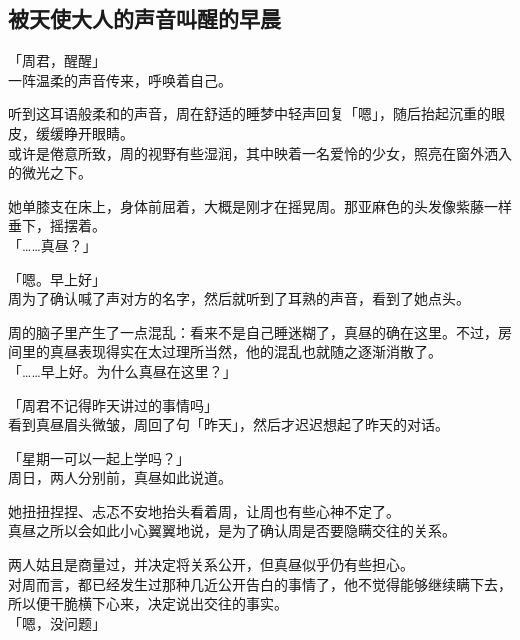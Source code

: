 \subsection{被天使大人的声音叫醒的早晨}

「周君，醒醒」\\

一阵温柔的声音传来，呼唤着自己。

听到这耳语般柔和的声音，周在舒适的睡梦中轻声回复「嗯」，随后抬起沉重的眼皮，缓缓睁开眼睛。\\

或许是倦意所致，周的视野有些湿润，其中映着一名爱怜的少女，照亮在窗外洒入的微光之下。

她单膝支在床上，身体前屈着，大概是刚才在摇晃周。那亚麻色的头发像紫藤一样垂下，摇摆着。\\

「……真昼？」

「嗯。早上好」\\

周为了确认喊了声对方的名字，然后就听到了耳熟的声音，看到了她点头。

周的脑子里产生了一点混乱：看来不是自己睡迷糊了，真昼的确在这里。不过，房间里的真昼表现得实在太过理所当然，他的混乱也就随之逐渐消散了。\\

「……早上好。为什么真昼在这里？」

「周君不记得昨天讲过的事情吗」\\

看到真昼眉头微皱，周回了句「昨天」，然后才迟迟想起了昨天的对话。\\

\vspace{2\baselineskip}

「星期一可以一起上学吗？」\\

周日，两人分别前，真昼如此说道。

她扭扭捏捏、忐忑不安地抬头看着周，让周也有些心神不定了。\\

真昼之所以会如此小心翼翼地说，是为了确认周是否要隐瞒交往的关系。

两人姑且是商量过，并决定将关系公开，但真昼似乎仍有些担心。\\

对周而言，都已经发生过那种几近公开告白的事情了，他不觉得能够继续瞒下去，所以便干脆横下心来，决定说出交往的事实。\\

「嗯，没问题」

